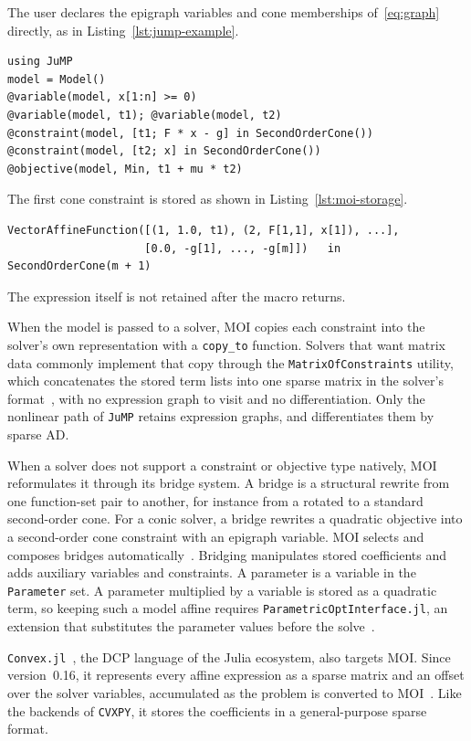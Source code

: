 The user declares the epigraph variables and cone memberships of~\eqref{eq:graph}
directly, as in Listing~\ref{lst:jump-example}.
\begin{lstlisting}[caption={The running example~\eqref{eq:example} in \texttt{JuMP}.},
label=lst:jump-example]
using JuMP
model = Model()
@variable(model, x[1:n] >= 0)
@variable(model, t1); @variable(model, t2)
@constraint(model, [t1; F * x - g] in SecondOrderCone())
@constraint(model, [t2; x] in SecondOrderCone())
@objective(model, Min, t1 + mu * t2)
\end{lstlisting}
The first cone constraint is stored as shown in Listing~\ref{lst:moi-storage}.
\begin{lstlisting}[caption={The first cone constraint as stored by \texttt{MOI}.},
label=lst:moi-storage]
VectorAffineFunction([(1, 1.0, t1), (2, F[1,1], x[1]), ...],
                     [0.0, -g[1], ..., -g[m]])   in   SecondOrderCone(m + 1)
\end{lstlisting}
The expression itself is not retained after the macro returns.

When the model is passed to a solver, MOI copies each constraint into the solver's own
representation with a \texttt{copy\_to} function. Solvers that want matrix data commonly implement
that copy through the \texttt{MatrixOfConstraints} utility, which concatenates the stored term
lists into one sparse matrix in the solver's format~\cite{moidocs}, with no expression graph to
visit and no differentiation. Only the nonlinear path of \texttt{JuMP} retains expression graphs,
and differentiates them by sparse AD.

When a solver does not support a constraint or objective type natively, MOI reformulates it
through its bridge system. A bridge is a structural rewrite from one function-set pair to
another, for instance from a rotated to a standard second-order cone. For a conic solver, a
bridge rewrites a quadratic objective into a second-order cone constraint with an epigraph
variable. MOI selects and composes bridges automatically~\cite{legat2020mathoptinterface}.
Bridging manipulates stored coefficients and adds
auxiliary variables and constraints. A parameter is a variable in the \texttt{Parameter} set. A
parameter multiplied by a variable is stored as a quadratic term, so keeping such a model affine
requires \texttt{ParametricOptInterface.jl}, an extension that substitutes the parameter values
before the solve~\cite{jumpdocs}.

\texttt{Convex.jl}~\cite{udell2014convex}, the \ac{DCP} language of the Julia ecosystem, also
targets \ac{MOI}. Since version~0.16, it represents every affine expression as a sparse matrix
and an offset over the solver variables, accumulated as the problem is converted to
\ac{MOI}~\cite{convexjl2024release}. Like the backends of \texttt{CVXPY}, it stores the
coefficients in a general-purpose sparse format.

